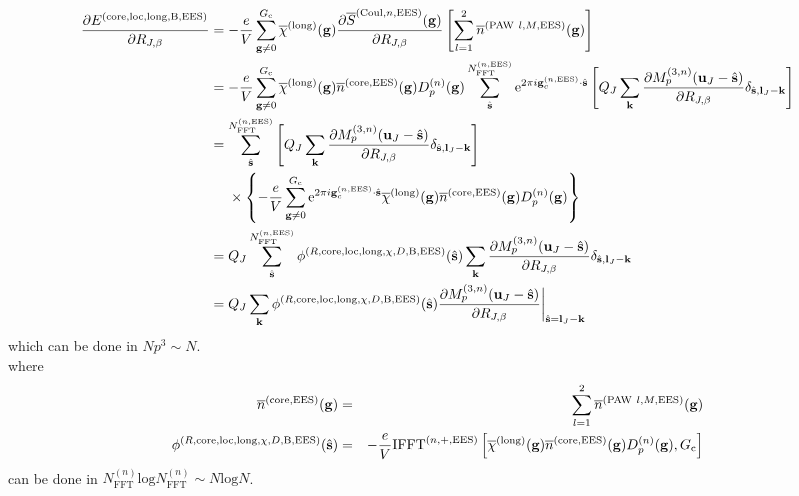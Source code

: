 \documentclass[paper=a4, fontsize=11pt]{article} %
\numberwithin{equation}{section} %
\numberwithin{figure}{section} %
\numberwithin{table}{section} %
\newcommand{\p}{\partial}
\newcommand{\ol}{\overline}
\newcommand{\bu}{{\bf{u}}}
\newcommand{\bl}{{\bf{l}}}
\newcommand{\bk}{{\bf{k}}}
\newcommand{\bs}{{\bf{s}}}
\newcommand{\bg}{{\bf{g}}}
\newcommand{\hs}{{\hat{\bf{s}}}}
\newcommand{\rEES}{{\mathrm{EES}}}
\newcommand{\rcore}{{\mathrm{core}}}
\newcommand{\re}{{\mathrm{e}}}
\newcommand{\rCo}{{\mathrm{Coul}}}
\newcommand{\rlong}{{\mathrm{long}}}
\newcommand{\rP}{{\mathrm{PAW}}}
\newcommand{\rB}{{\mathrm{B}}}
\newcommand{\rlo}{{\mathrm{loc}}}
\newcommand{\rl}{{\mathrm{log}}}
\newcommand{\gcnEES}{{\bg_c^{(n,\rEES)}}}
\newcommand{\RJb}{{R_{J,\beta}}}
\newcommand{\NFFTn}{{N^{(n)}_{\mathrm{FFT}}}}
\newcommand{\NFFTnEES}{{N^{(n,\rEES)}_{\mathrm{FFT}}}}
\newcommand{\Gc}{{G_{\mathrm{c}}}}
\newcommand{\Dng}{{D^{(n)}_p(\bg)}}
\newcommand{\Mn}{{M_p^{(3,n)}}}
\newcommand{\IFFTnEES}{{\mathrm{IFFT}^{(n,+,\rEES)}}}
\begin{document}
\begin{equation}
\begin{split}
\frac{\p E^{(\rcore,\rlo,\rlong,\rB,\rEES)}}{\p \RJb}
&= -\frac{e}{V} \sum_{\bg \neq 0}^{\Gc} \ol \chi^{(\rlong)}(\bg)  \frac{\p \ol S^{(\rCo,n,\rEES)}(\bg)}{\p \RJb} \left[\sum_{l=1}^2 \ol n^{(\rP\ l,M,\rEES)}(\bg)\right]\\
&= -\frac{e}{V} \sum_{\bg \neq 0}^{\Gc} \ol \chi^{(\rlong)}(\bg) \ol n^{(\rcore,\rEES)}(\bg)\Dng \sum_{\hat \bs}^\NFFTnEES \re^{2\pi i\gcnEES \cdot \hat\bs} \left[Q_{J} \sum_{\bk} \frac{\p \Mn (\bu_{J}-\hat \bs)}{\p \RJb}\delta_{\hat \bs,\bl_{J}-\bk}\right] \\
&= \sum_{\hat \bs}^\NFFTnEES  \left[Q_{J} \sum_{\bk} \frac{\p \Mn (\bu_{J}-\hat \bs)}{\p \RJb}\delta_{\hat \bs,\bl_{J}-\bk}\right] \\
&\ \ \ \ \times \left\{-\frac{e}{V} \sum_{\bg \neq 0}^{\Gc}\re^{2\pi i\gcnEES \cdot \hat\bs} \ol \chi^{(\rlong)}(\bg) \ol n^{(\rcore,\rEES)}(\bg)\Dng \right\}\\
&= Q_J \sum_{\hat \bs}^\NFFTnEES \phi^{(R,\rcore,\rlo,\rlong,\chi,D,\rB,\rEES)}(\hs) \sum_{\bk} \frac{\p \Mn (\bu_{J}-\hat \bs)}{\p \RJb}\delta_{\hat \bs,\bl_{J}-\bk} \\
&= Q_J \sum_{\bk} \phi^{(R,\rcore,\rlo,\rlong,\chi,D,\rB,\rEES)}(\hs) \frac{\p \Mn (\bu_{J}-\hat \bs)}{\p \RJb} \bigg|_{\hs = \bl_J-\bk}\\
\end{split}
\end{equation}
which can be done in $Np^3 \sim N$. \\

where
\begin{eqnarray}
\ol n^{(\rcore,\rEES)}(\bg) &=& \sum_{l=1}^2 \ol n^{(\rP\ l,M,\rEES)}(\bg) \\
\phi^{(R,\rcore,\rlo,\rlong,\chi,D,\rB,\rEES)}(\hs) &=& -\frac{e}{V}\IFFTnEES\left[\ol \chi^{(\rlong)}(\bg) \ol n^{(\rcore,\rEES)}(\bg)\Dng, \Gc\right]
\end{eqnarray}
can be done in $\NFFTn \rl \NFFTn \sim N \rl N$.\\
\end{document}
